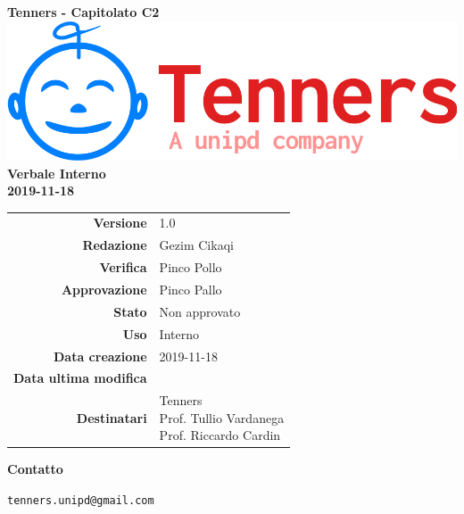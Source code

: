 \begin{titlepage}
	\begin{center}
		\large \textbf{Tenners - Capitolato C2}
		\vfill
		\includegraphics[scale = 0.3]{./res/img/logo.png}\\
		\vfill
		\Huge \textbf{Verbale Interno} \\
		\textbf {2019-11-18}

        \vfill
        \large

        \begin{tabular}{r|l}
                        \textbf{Versione} & 1.0 \\
                        \textbf{Redazione} & Gezim Cikaqi \\
                        \textbf{Verifica} &  Pinco Pollo \\
                        \textbf{Approvazione} & Pinco Pallo \\
                        \textbf{Stato} & Non approvato \\
                        \textbf{Uso} &  Interno\\
                        \textbf{Data creazione} &  2019-11-18\\
                        \textbf{Data ultima modifica} &  \\
                        \textbf{Destinatari} & \parbox[t]{5cm}{Tenners \\ Prof. Tullio Vardanega\\ Prof. Riccardo Cardin}
                \end{tabular}
                \vfill
                \normalsize
                \vfill
                \textbf{Contatto}
                
                \texttt{tenners.unipd@gmail.com}

	\end{center}
\end{titlepage}
